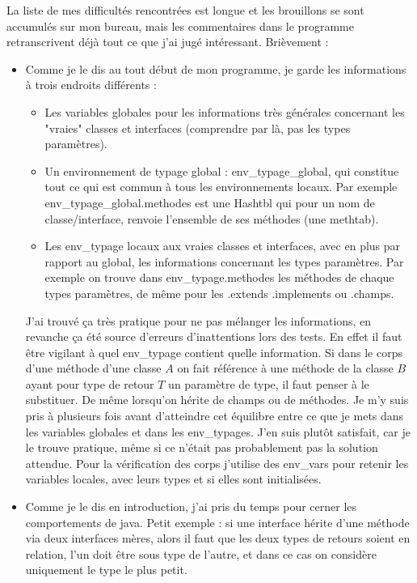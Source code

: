\documentclass[12pt,a4paper]{report}
\begin{document}
La liste de mes difficultés rencontrées est longue et les brouillons se sont accumulés sur mon bureau, mais les commentaires dans le programme retranscrivent déjà tout ce que j'ai jugé intéressant. Brièvement :
\begin{itemize}
\item Comme je le dis au tout début de mon programme, je garde les informations à trois endroits différents : 
\begin{itemize}
\item Les variables globales pour les informations très générales concernant les "vraies" classes et interfaces (comprendre par là, pas les types paramètres).
\item Un environnement de typage global : env\_typage\_global, qui constitue tout ce qui est commun à tous les environnements locaux. Par exemple env\_typage\_global.methodes est une Hashtbl qui pour un nom de classe/interface, renvoie l'ensemble de ses méthodes (une methtab).
\item Les env\_typage locaux aux vraies classes et interfaces, avec en plus par rapport au global, les informations concernant les types paramètres. Par exemple on trouve dans env\_typage.methodes les méthodes de chaque types paramètres, de même pour les .extends .implements ou .champs.
\end{itemize}
J'ai trouvé ça très pratique pour ne pas mélanger les informations, en revanche ça été source d'erreurs d'inattentions lors des tests. En effet il faut être vigilant à quel env\_typage contient quelle information. Si dans le corps d'une méthode d'une classe $A$ on fait référence à une méthode de la classe $B$ ayant pour type de retour $T$ un paramètre de type, il faut penser à le substituer. De même lorsqu'on hérite de champs ou de méthodes. Je m'y suis pris à plusieurs fois avant d'atteindre cet équilibre entre ce que je mets dans les variables globales et dans les env\_typages. J'en suis plutôt satisfait, car je le trouve pratique, même si ce n'était pas probablement pas la solution attendue. Pour la vérification des corps j'utilise des env\_vars pour retenir les variables locales, avec leurs types et si elles sont initialisées.
\item Comme je le dis en introduction, j'ai pris du temps pour cerner les comportements de java. Petit exemple : si une interface hérite d'une méthode via deux interfaces mères, alors il faut que les deux types de retours soient en relation, l'un doit être sous type de l'autre, et dans ce cas on considère uniquement le type le plus petit. \\

\end{itemize}
\end{document}
